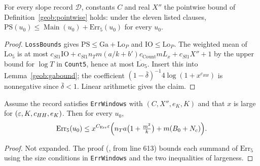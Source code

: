 \begin{theorem}\label{geob:eachunit}
For every slope record $\mathcal D$, constants $C$ and real $X''$ the pointwise
bound of Definition~\ref{geob:pointwise} holds: under the eleven listed
clauses, $\mathrm{PS}(u_0)\le\operatorname{Main}(u_0)+\mathrm{Err}_5(u_0)$ for
every $u_0$.
\end{theorem}
\begin{proof}
\texttt{LossBounds} gives $\mathrm{PS}\le\mathrm{Ga}+\mathrm{Lo}_P$ and
$\mathrm{IO}\le\mathrm{Lo}_P$. The weighted mean of $\mathrm{Lo}_5$ is at most
$c_{Sl1}\mathrm{IO}+c_{Sl1}n_Tm(a/k+b')c_{\mathrm{Count}}mL_x+c_{Sl1}X''+1$ by the
upper bound for $\log T$ in \texttt{Count5}, hence at most
$\overline{\mathrm{Lo}}_5$. Insert this into Lemma~\ref{geob:gabound}; the
coefficient $(1-\bar\delta)^{-1}4\log(1+x^{c_{HH}})$ is nonnegative since
$\bar\delta<1$. Linear arithmetic gives the claim.
\end{proof}

\begin{lemma}\label{geob:errx5}
Assume the record satisfies \texttt{ErrWindows} with $(C,X'',e_K,K)$ and that
$x$ is large for $(\varepsilon,K,c_{HH},e_K)$. Then for every $u_0$,
\[
\mathrm{Err}_5(u_0)\le x^{C_{\mathrm{Err}}\varepsilon}\Bigl(n_Ta\bigl(1+\tfrac{m^2}k\bigr)+m(B_0+N_c)\Bigr).
\]
\end{lemma}
\begin{proof}
Not expanded. The proof
(, from line
613) bounds each summand of $\mathrm{Err}_5$ using the size conditions in
\texttt{ErrWindows} and the two inequalities of largeness.
\end{proof}

